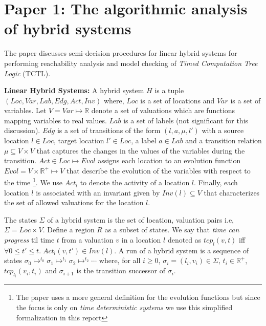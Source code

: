 \newcommand{\real}{\mathbb{R}}
\newcommand{\loc}{\mathit{Loc}}
\newcommand{\var}{\mathit{Var}}
\newcommand{\lab}{\mathit{Lab}}
\newcommand{\edg}{\mathit{Edg}}
\newcommand{\act}{\mathit{Act}}
\newcommand{\evol}{\mathit{Evol}}
\newcommand{\invr}{\mathit{Inv}}
\newcommand{\trans}{\mathit{(l,a,\mu,l')}}
\newcommand{\reach}{\mapsto^*}
\newcommand{\ftclosure}[2]{\langle #1 \rangle^{\nearrow}_{#2}}
\newcommand{\btclosure}[2]{\langle #1 \rangle^{\swarrow}_{#2}}
\newcommand{\lfp}{\mathit{lfp}}
\newcommand{\wide}{\nabla}
\newcommand{\pred}{\triangleright}

\section{Paper 1: The algorithmic analysis of hybrid systems \cite{Alur:95}} \label{sec:paper1}

The paper discusses semi-decision procedures for linear hybrid systems for performing reachability analysis and 
model checking of \emph{Timed Computation Tree Logic} (TCTL). 

\textbf{Linear Hybrid Systems:}
A hybrid system $H$ is a tuple $(\loc,\var,\lab,\edg,\act,\invr)$ where,
$\loc$ is a set of locations and $\var$ is a set of variables. 
Let $V= \var \mapsto \real$ denote a set of valuations which are functions mapping variables to real values.
$\lab$ is a set of labels (not significant for this discussion). $\edg$ is a set of transitions of the form $\trans$ with a source location $l \in \loc$, target location $l' \in \loc$, a label $a \in \lab$ and a transition relation $\mu \subseteq V \times V$ that captures the changes in the values of the variables during the transition. 
$\act \in \loc \mapsto \evol$ assigns each location to an evolution function $\evol = V \times \real^+ \mapsto V$ that describe the evolution of the variables with respect to the time
\footnote{The paper uses a more general definition for the evolution functions but since the focus is only on \emph{time deterministic systems} we use this simplified formalization in this report}. 
We use $\act_l$ to denote the activity of a location $l$.
Finally, each location $l$ is associated with an invariant given by $\invr(l) \subseteq V$ that characterizes the set of allowed valuations for the location $l$.

The states $\Sigma$ of a hybrid system is the set of location, valuation pairs i.e, $\Sigma = \loc \times V$.
Define a region $R$ as a subset of states.
We say that \emph{time can progress} til time $t$ from a valuation $v$ in a location $l$ denoted as 
$tcp_l(v,t)$ iff $\forall 0 \le t' \le t. \; \act_l(v,t') \in \invr(l)$.
A run of a hybrid system is a sequence of states $\sigma_0 \mapsto^{t_0} \sigma_1 \mapsto^{t_1} \sigma_2 \mapsto^{t_2} \cdots$ 
where, for all $i \ge 0$, $\sigma_i = (l_i,v_i) \in \Sigma$, $t_i \in \real^+$,
$tcp_{l_i}(v_i,t_i)$ and
$\sigma_{i+1}$ is the transition successor of $\sigma_i$.

